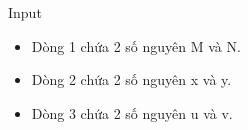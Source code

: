 Input
\begin{itemize}
	\item     Dòng 1 chứa 2 số nguyên M và N.   
	\item     Dòng 2 chứa 2 số nguyên x và y.   
	\item     Dòng 3 chứa 2 số nguyên u và v.   
\end{itemize}